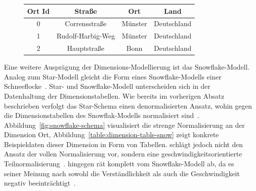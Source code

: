 \documentclass[
  language=german, %
  type=bachelor%
]{isthesis}
\begin{document}
\begin{content}
  \begin{figure}[caption={Beispiel der Dimensionstabelle \textit{Ort} im Star-Schema}, label={table:dimension-table}]
    \footnotesize
    \begin{tabular}{c c c c}
      Ort Id & Straße & Ort & Land \\
      \toprule
      0 & Corrensstraße & Münster & Deutschland \\
      1 & Rudolf-Harbig-Weg & Münster & Deutschland \\
      2 & Hauptstraße & Bonn & Deutschland \\
    \end{tabular}
  \end{figure}

  Eine weitere Ausprägung der Dimensions-Modellierung ist das Snowflake-Modell.
  Analog zum Star-Modell gleicht die Form eines Snowflake-Modells einer
  Schneeflocke~\cite[][S. 70]{Kemper2010}. Star- und Snowflake-Modell
  unterscheiden sich in der Datenhaltung der Dimensionstabellen. Wie bereits im
  vorherigen Absatz beschrieben verfolgt das Star-Schema einen denormalisierten
  Ansatz, wohin gegen die Dimensionstabellen des Snowflak-Modells normalisiert
  sind~\cite[][S. 70]{Kemper2010}. Abbildung~\ref{fig:snowflake-schema}
  visualisiert die strenge Normalisierung an der Dimension Ort,
  Abbildung~\ref{table:dimension-table-snow} zeigt konkrete Beispieldaten dieser
  Dimension in Form von Tabellen.  \textsc{\citeauthor{Kemper2010}} schlägt
  jedoch nicht den Ansatz der vollen Normalisierung vor, sondern eine
  geschwindigkeitsorientierte Teilnormalisierung~\cite[][S. 70]{Kemper2010}.
  \textsc{\citeauthor{Kimball2013}} hingegen rät komplett vom Snowflake-Modell
  ab, da es seiner Meinung nach sowohl die Verständlichkeit als auch \ggf{} die
  Geschwindigkeit negativ beeinträchtigt~\cite[][S. 50]{Kimball2013}.

  \begin{figure}[caption={Teilausschnitt eines Snowflake-Schema}, label={fig:snowflake-schema}]
    \resizebox{250pt}{!}{}
  \end{figure}


\end{content}
\end{document}
